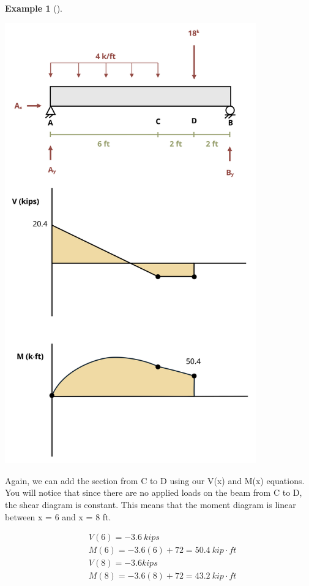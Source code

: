 \documentclass[
  letterpaper,
  DIV=11,
  numbers=noendperiod]{scrreprt}
\theoremstyle{definition}
\newtheorem{example}{Example}[chapter]
\theoremstyle{remark}
\begin{document}
\begin{tcolorbox}
\begin{example}[]
\begin{tcolorbox}
\begin{center}
\includegraphics[width=4.27083in,height=\textheight]{images/CH7 PNGs/example 7.2 part 7.png}
\end{center}

Again, we can add the section from C to D using our V(x) and M(x)
equations. You will notice that since there are no applied loads on the
beam from C to D, the shear diagram is constant. This means that the
moment diagram is linear between x = 6 and x = 8 ft.

\[
\begin{aligned}
&V(6)=-3.6{~kips} \\
&M(6)=-3.6(6)+72=50.4{~kip}\cdot{ft} \\
&V(8)=-3.6 {kips} \\
&M(8)=-3.6(8)+72=43.2{~kip}\cdot{ft} \\
\end{aligned}
\]


\end{tcolorbox}
\end{example}
\end{tcolorbox}
\end{document}
